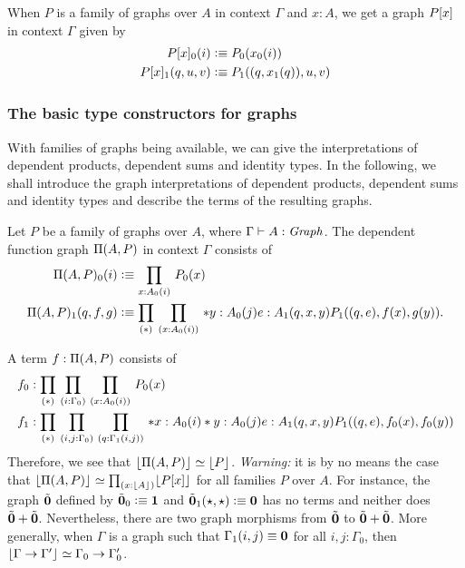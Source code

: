 \begin{defn}
When $P$ is a family of graphs over $A$ in context $\Gamma$ and $x:A$, we
get a graph $\subst{x}{P}$ in context $\Gamma$ given by
\begin{align*}
\subst{x}{P}_0(i) & \defeq P_0(x_0(i))\\
\subst{x}{P}_1(q,u,v) & \defeq P_1(\pairr{q,x_1(q)},u,v)
\end{align*}
\end{defn}

\subsubsection{The basic type constructors for graphs}
With families of graphs being available, we can give the interpretations of
dependent products, dependent sums and identity types. In the following, we
shall introduce the graph interpretations of dependent products, dependent
sums and identity types and describe the terms of the resulting graphs.

\begin{defn}
Let $P$ be a family of graphs over $A$, where $\Gamma\vdash A:\mathit{Graph}$. 
The dependent function graph $\Pi(A,P)$ in context $\Gamma$ consists of
\begin{align*}
\mprd{A}{P}_0(i) & \defeq \prd{x:A_0(i)}P_0(x)\\
\mprd{A}{P}_1(q,f,g) & \defeq \prd*{x:A_0(i)}*{y:A_0(j)}{e:A_1(q,x,y)}P_1(\pairr{q,e},f(x),g(y)).
\end{align*}
\end{defn}

\begin{rmk}
A term $f:\Pi(A,P)$ consists of
\begin{align*}
f_0 & : \prd*{i:\Gamma_0}{x:A_0(i)}P_0(x)\\
f_1 & : \prd*{i,j:\Gamma_0}{q:\Gamma_1(i,j)}*{x:A_0(i)}*{y:A_0(j)}{e:A_1(q,x,y)}P_1(\pairr{q,e},f_0(x),f_0(y))
\end{align*}
Therefore, we see that $\lfloor \Pi(A,P) \rfloor^{} \simeq \lfloor P \rfloor^{}$. \emph{Warning:} it
is by no means the case that $\eqv{\terms{\mprd{A}{P}}}{\prd{x:\terms{A}}
\terms{\subst{x}{P}}}$ for all families $P$ over $A$. For instance, the graph
$\tilde{\mathbf{0}}$ defined by $\tilde{\mathbf{0}}_0\vcentcolon\equiv\mathbf{1}$ and 
$\tilde{\mathbf{0}}_1(\star,\star)\vcentcolon\equiv\mathbf{0}$ has no terms and neither does
$\tilde{\mathbf{0}}+\tilde{\mathbf{0}}$. Nevertheless, there are two graph morphisms
from $\tilde{\mathbf{0}}$ to $\tilde{\mathbf{0}}+\tilde{\mathbf{0}}$. More generally,
when $\Gamma$ is a graph such that $\Gamma_1(i,j)\equiv\mathbf{0}$ for all $i,j:\Gamma_0$,
then ${\lfloor \Gamma\to\Gamma' \rfloor^{}} \simeq \Gamma_0\to\Gamma^\prime_0$.
\end{rmk}

